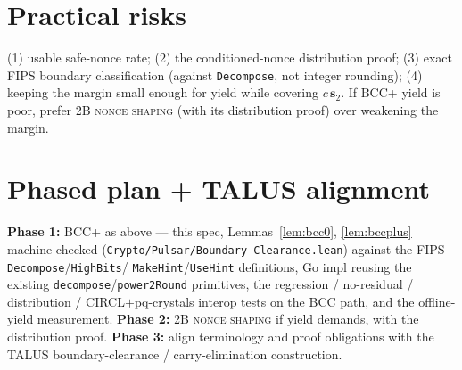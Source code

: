 \documentclass[11pt]{article}
\theoremstyle{remark}\newtheorem{remark}{Remark}
\begin{document}
\section{Practical risks}
(1) usable safe-nonce rate; (2) the conditioned-nonce distribution proof;
(3) exact FIPS boundary classification (against \texttt{Decompose}, not
integer rounding); (4) keeping the margin small enough for yield while
covering $c\,\mathbf s_2$. If BCC+ yield is poor, prefer \textsc{2B nonce
shaping} (with its distribution proof) over weakening the margin.

\section{Phased plan + TALUS alignment}
\textbf{Phase 1:} BCC+ as above --- this spec, Lemmas~\ref{lem:bcc0},
\ref{lem:bccplus} machine-checked (\texttt{Crypto/Pulsar/Boundary\-
Clearance.lean}) against the FIPS \texttt{Decompose}/\texttt{HighBits}/
\texttt{MakeHint}/\texttt{UseHint} definitions, Go impl reusing the
existing \texttt{decompose}/\texttt{power2Round} primitives, the
regression / no-residual / distribution / CIRCL$+$pq-crystals interop
tests on the BCC path, and the offline-yield measurement.
\textbf{Phase 2:} \textsc{2B nonce shaping} if yield demands, with the
distribution proof. \textbf{Phase 3:} align terminology and proof
obligations with the TALUS boundary-clearance / carry-elimination
construction.
\end{document}
